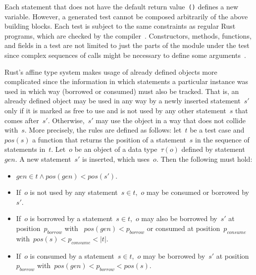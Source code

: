 \documentclass[paper=a4,%
  twoside,%
  BCOR4mm,%
  abstract=true,%
  toc=bibliography,%
  chapterprefix=true,%
  toc=bibliographynumbered,%
  open=right,%
  english,%
  pagesize=pdftex]{scrreprt}
\begin{document}
Each statement that does not have the default return value~\texttt{()} defines a new variable. However, a generated test cannot be composed arbitrarily of the above building blocks. Each test is subject to the same constraints as regular Rust programs, which are checked by the compiler~\cite{Tonella2004}. Constructors, methods, functions, and fields in a test are not limited to just the parts of the module under the test since complex sequences of calls might be necessary to define some arguments~\cite{Fraser2012}.

Rust's affine type system makes usage of already defined objects more complicated since the information in which statements a particular instance was used in which way (borrowed or consumed) must also be tracked. That is, an already defined object may be used in any way by a newly inserted statement~$s'$ only if it is marked as free to use and is not used by any other statement~$s$ that comes after~$s'$. Otherwise,~$s'$ may use the object in a way that does not collide with~$s$. More precisely, the rules are defined as follows: let~$t$ be a test case and $pos(s)$ a function that returns the position of a statement~$s$ in the sequence of statements in~$t$. Let~$o$ be an object of a data type~$\tau(o)$ defined by statement~$gen$. A new statement~$s'$ is inserted, which uses~$o$. Then the following must hold:
\begin{itemize}
    \item $gen \in t \wedge pos(gen) < pos(s')$.
    \item If~$o$ is not used by any statement~$s \in t$,~$o$ may be consumed or borrowed by~$s'$.
    \item If~$o$ is borrowed by a statement~$s \in t$,~$o$ may also be borrowed by~$s'$ at position~$p_{borrow}$ with ~$pos(gen) < p_{borrow}$ or consumed at position~$p_{consume}$ with~$pos(s) < p_{consume} < \left|t\right|$.
    \item If~$o$ is consumed by a statement~$s \in t$,~$o$ may be borrowed by~$s'$ at position~$p_{borrow}$ with~$pos(gen) < p_{borrow} < pos(s)$.
\end{itemize}

\end{document}
